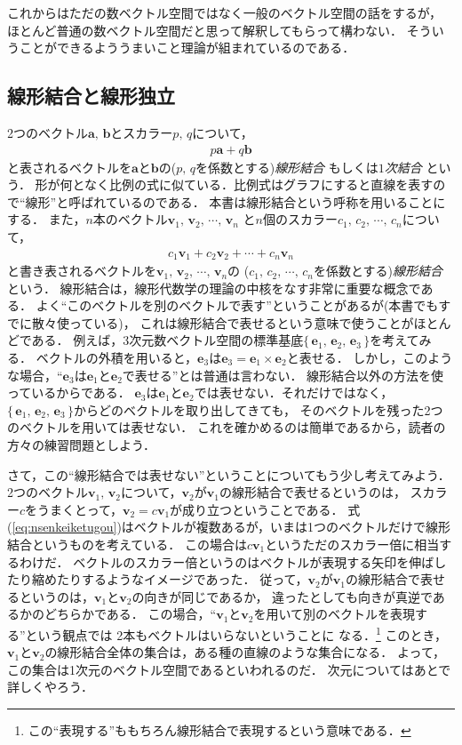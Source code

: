 これからはただの数ベクトル空間ではなく一般のベクトル空間の話をするが，
ほとんど普通の数ベクトル空間だと思って解釈してもらって構わない．
そういうことができるよううまいこと理論が組まれているのである．
\subsection{線形結合と線形独立}
2つのベクトル$\bm{a}, \, \bm{b}$とスカラー$p, \, q$について，
\begin{align}
p\bm{a}+q\bm{b}
\label{eq:senkeiketugou}
\end{align}
と表されるベクトルを$\bm{a}$と$\bm{b}$の($p, \, q$を係数とする)\emph{線形結合}
もしくは\emph{$1$次結合}
という．
形が何となく比例の式に似ている．比例式はグラフにすると直線を表すので``線形''と呼ばれているのである．
本書は線形結合という呼称を用いることにする．
また，$n$本のベクトル$\bm{v}_1, \, \bm{v}_2, \, \cdots, \, \bm{v}_n$
と$n$個のスカラー$c_1, \, c_2, \, \cdots, \, c_n$について，
\begin{align}
c_1 \bm{v}_1 + c_2 \bm{v}_2 + \cdots + c_n \bm{v}_n
\label{eq:nsenkeiketugou}
\end{align}
と書き表されるベクトルを$\bm{v}_1, \, \bm{v}_2, \, \cdots , \, \bm{v}_n$の
($c_1, \, c_2, \, \cdots, \, c_n$を係数とする)\emph{線形結合}という．
線形結合は，線形代数学の理論の中核をなす非常に重要な概念である．
よく``このベクトルを別のベクトルで表す''ということがあるが(本書でもすでに散々使っている)，
これは線形結合で表せるという意味で使うことがほとんどである．
例えば，3次元数ベクトル空間の標準基底$ \{ \, \bm{e}_1, \, \bm{e}_2, \, \bm{e}_3 \, \} $を考えてみる．
ベクトルの外積を用いると，$\bm{e}_3$は$\bm{e}_3 = \bm{e}_1 \times \bm{e}_2$と表せる．
しかし，このような場合，``$\bm{e}_3$は$\bm{e}_1$と$\bm{e}_2$で表せる''とは普通は言わない．
線形結合以外の方法を使っているからである．
$\bm{e}_3$は$\bm{e}_1$と$\bm{e}_2$では表せない．それだけではなく，
$\{ \, \bm{e}_1, \, \bm{e}_2, \, \bm{e}_3 \, \}$からどのベクトルを取り出してきても，
そのベクトルを残った2つのベクトルを用いては表せない．
これを確かめるのは簡単であるから，読者の方々の練習問題としよう．

さて，この``線形結合では表せない''ということについてもう少し考えてみよう．
2つのベクトル$\bm{v}_1, \, \bm{v}_2$について，$\bm{v}_2$が$\bm{v}_1$の線形結合で表せるというのは，
スカラー$c$をうまくとって，$\bm{v}_2 = c \bm{v}_1$が成り立つということである．
式(\ref{eq:nsenkeiketugou})はベクトルが複数あるが，いまは1つのベクトルだけで線形結合というものを考えている．
この場合は$c \bm{v}_1$というただのスカラー倍に相当するわけだ．
ベクトルのスカラー倍というのはベクトルが表現する矢印を伸ばしたり縮めたりするようなイメージであった．
従って，$\bm{v}_2$が$\bm{v}_1$の線形結合で表せるというのは，$\bm{v}_1$と$\bm{v}_2$の向きが同じであるか，
違ったとしても向きが真逆であるかのどちらかである．
この場合，``$\bm{v}_1$と$\bm{v}_2$を用いて別のベクトルを表現する''という観点では
2本もベクトルはいらないということに
なる．\footnote{この``表現する''ももちろん線形結合で表現するという意味である．}
このとき，$\bm{v}_1$と$\bm{v}_2$の線形結合全体の集合は，ある種の直線のような集合になる．
よって，この集合は1次元のベクトル空間であるといわれるのだ．
次元についてはあとで詳しくやろう．

